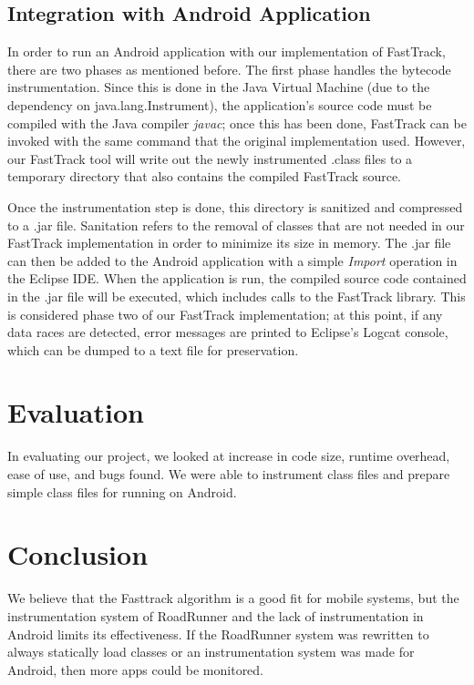 \documentclass{acm_proc_article-sp}
\begin{document}
\subsection{Integration with Android Application}
In order to run an Android application with our implementation of FastTrack, there are two phases as mentioned before. The first phase handles the bytecode instrumentation. Since this is done in the Java Virtual Machine (due to the dependency on java.lang.Instrument), the application's source code must be compiled with the Java compiler \emph{javac}; once this has been done, FastTrack can be invoked with the same command that the original implementation used. However, our FastTrack tool will write out the newly instrumented .class files to a temporary directory that also contains the compiled FastTrack source. 

Once the instrumentation step is done, this directory is sanitized and compressed to a .jar file.  Sanitation refers to the removal of classes that are not needed in our FastTrack implementation in order to minimize its size in memory. The .jar file can then be added to the Android application with a simple \emph{Import} operation in the Eclipse IDE. When the application is run, the compiled source code contained in the .jar file will be executed, which includes calls to the FastTrack library. This is considered phase two of our FastTrack implementation; at this point, if any data races are detected, error messages are printed to Eclipse's Logcat console, which can be dumped to a text file for preservation.


\section{Evaluation}
In evaluating our project, we looked at increase in code size, runtime overhead, ease of use, and bugs found. We were able to instrument class files and prepare simple class files for running on Android.

\section{Conclusion}
We believe that the Fasttrack algorithm is a good fit for mobile systems, but the instrumentation system of RoadRunner and the lack of instrumentation in Android limits its effectiveness. If the RoadRunner system was rewritten to always statically load classes or an instrumentation system was made for Android, then more apps could be monitored.



\end{document}
